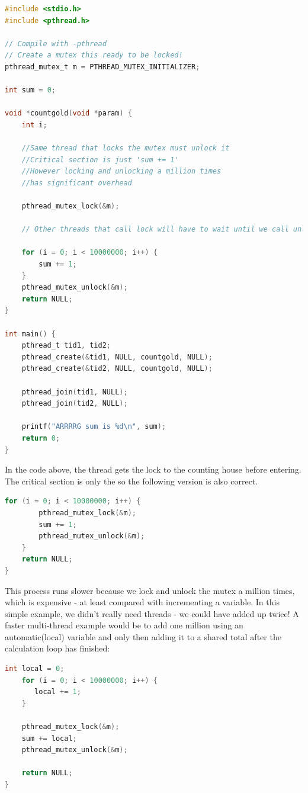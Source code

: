 \begin{lstlisting}[language=C]
#include <stdio.h>
#include <pthread.h>

// Compile with -pthread
// Create a mutex this ready to be locked!
pthread_mutex_t m = PTHREAD_MUTEX_INITIALIZER;

int sum = 0;

void *countgold(void *param) {
    int i;
    
    //Same thread that locks the mutex must unlock it
    //Critical section is just 'sum += 1'
    //However locking and unlocking a million times
    //has significant overhead
    
    pthread_mutex_lock(&m);

    // Other threads that call lock will have to wait until we call unlock

    for (i = 0; i < 10000000; i++) {
        sum += 1;
    }
    pthread_mutex_unlock(&m);
    return NULL;
}

int main() {
    pthread_t tid1, tid2;
    pthread_create(&tid1, NULL, countgold, NULL);
    pthread_create(&tid2, NULL, countgold, NULL);

    pthread_join(tid1, NULL);
    pthread_join(tid2, NULL);

    printf("ARRRRG sum is %d\n", sum);
    return 0;
}
\end{lstlisting}

In the code above, the thread gets the lock to the counting house before entering. The critical section is only the  so the following version is also correct.

\begin{lstlisting}[language=C]
    for (i = 0; i < 10000000; i++) {
        pthread_mutex_lock(&m);
        sum += 1;
        pthread_mutex_unlock(&m);
    }
    return NULL;
}
\end{lstlisting}

This process runs slower because we lock and unlock the mutex a million times, which is expensive - at least compared with incrementing a variable. In this simple example, we didn't really need threads - we could have added up twice! A faster multi-thread example would be to add one million using an automatic(local) variable and only then adding it to a shared total after the calculation loop has finished:

\begin{lstlisting}[language=C]
    int local = 0;
    for (i = 0; i < 10000000; i++) {
       local += 1;
    }

    pthread_mutex_lock(&m);
    sum += local;
    pthread_mutex_unlock(&m);

    return NULL;
}
\end{lstlisting}

